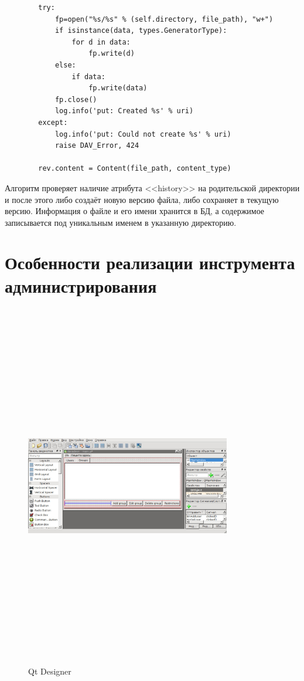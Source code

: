 \documentclass[utf8,usehyperref,12pt]{G7-32}
\begin{document}
\begin{lstlisting}
        try:
            fp=open("%s/%s" % (self.directory, file_path), "w+")
            if isinstance(data, types.GeneratorType):
                for d in data:
                    fp.write(d)
            else:
                if data:
                    fp.write(data)
            fp.close()
            log.info('put: Created %s' % uri)
        except:
            log.info('put: Could not create %s' % uri)
            raise DAV_Error, 424
        
        rev.content = Content(file_path, content_type) 
\end{lstlisting}

Алгоритм проверяет наличие атрибута <<history>> на родительской директории и после этого либо создаёт новую версию файла, либо сохраняет в текущую версию. Информация о файле и его имени хранится в БД, а содержимое записывается под уникальным именем в указанную директорию.

\section{Особенности реализации инструмента администрирования}

\begin{figure}[ht!]
   \centering%
   \includegraphics[height=160mm, width=0.8\textwidth, clip, keepaspectratio]{pictures/qt_designer}
   \caption{Qt Designer}\label{fig:qt_designer}
\end{figure}
\end{document}
